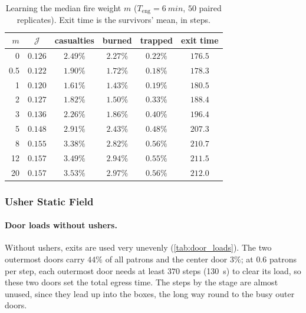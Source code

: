 \documentclass[14pt]{article}
\theoremstyle{definition}
\begin{document}
\begin{table}[H]
  \centering
  \caption{Learning the median fire weight $m$ ($T_{\text{eng}} = \SI{6}{min}$, $50$
  paired replicates). Exit time is the survivors' mean, in steps.}
  \label{tab:kF}
  \begin{tabular}{rccccc}
    \toprule
    $m$ & $\mathcal{J}$ & casualties & burned & trapped & exit time \\
    \midrule
    0    & $0.126$ & $2.49\%$ & $2.27\%$ & $0.22\%$ & $176.5$ \\
    0.5  & $0.122$ & $1.90\%$ & $1.72\%$ & $0.18\%$ & $178.3$ \\
    1    & $0.120$ & $1.61\%$ & $1.43\%$ & $0.19\%$ & $180.5$ \\
    2    & $0.127$ & $1.82\%$ & $1.50\%$ & $0.33\%$ & $188.4$ \\
    3    & $0.136$ & $2.26\%$ & $1.86\%$ & $0.40\%$ & $196.4$ \\
    5    & $0.148$ & $2.91\%$ & $2.43\%$ & $0.48\%$ & $207.3$ \\
    8    & $0.155$ & $3.38\%$ & $2.82\%$ & $0.56\%$ & $210.7$ \\
    12   & $0.157$ & $3.49\%$ & $2.94\%$ & $0.55\%$ & $211.5$ \\
    20   & $0.157$ & $3.53\%$ & $2.97\%$ & $0.56\%$ & $212.0$ \\
    \bottomrule
  \end{tabular}
\end{table}

\subsubsection{Usher Static Field}\label{sec:results_ushers}
\paragraph{Door loads without ushers.} Without ushers, exits are used very unevenly
(\cref{tab:door_loads}). The two outermost doors carry $44\%$ of all patrons and the
center door $3\%$; at $0.6$ patrons per step, each outermost door needs at least
$370$ steps (\SI{130}{s}) to clear its load, so these two doors set the total egress
time. The steps by the stage are almost unused, since they lead up into the boxes, the
long way round to the busy outer doors.
\end{document}
